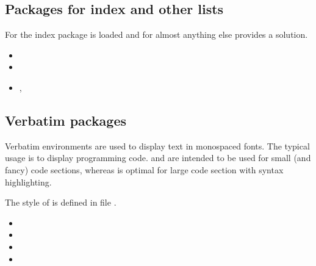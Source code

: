 
\subsection{Packages for index and other lists}
\label{sec:packages:index}

For the index package  is loaded and for almost anything else  provides a solution.

\begin{itemize}[noitemsep]
\item {}
\item {}
\item {}, 
\end{itemize}


\subsection{Verbatim packages}
\label{sec:packages:verbatim}

Verbatim environments are used to display text in monospaced fonts. The typical usage is to display programming code.  and  are intended to be used for small (and fancy) code sections, whereas  is optimal for large code section with syntax highlighting.

The style of  is defined in file 
.

\begin{itemize}[noitemsep]
\item {}
\item {}
\item {}
\item {}
\end{itemize}


